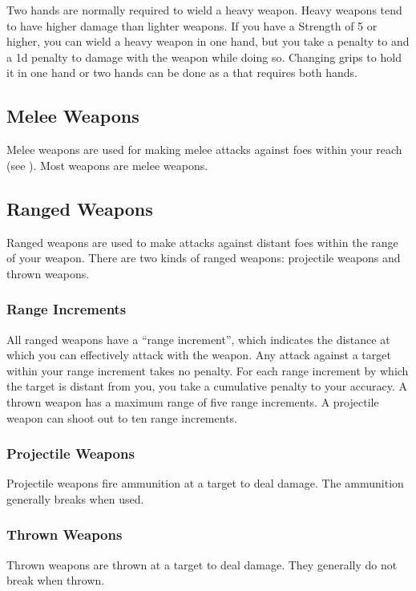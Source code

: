          Two hands are normally required to wield a heavy weapon.
        Heavy weapons tend to have higher damage than lighter weapons.
        If you have a Strength of 5 or higher, you can wield a heavy weapon in one hand, but you take a  penalty to  and a \minus1d penalty to damage with the weapon while doing so.
        Changing grips to hold it in one hand or two hands can be done as a  that requires both hands.


    \subsection{Melee Weapons}
        Melee weapons are used for making melee attacks against foes within your reach (see ). Most weapons are melee weapons.

    \subsection{Ranged Weapons}
        Ranged weapons are used to make attacks against distant foes within the range of your weapon. There are two kinds of ranged weapons: projectile weapons and thrown weapons.

        \subsubsection{Range Increments}\label{Range Increment} All ranged weapons have a ``range increment'', which indicates the distance at which you can effectively attack with the weapon. Any attack against a target within your range increment takes no penalty. For each range increment by which the target is distant from you, you take a cumulative  penalty to your accuracy. A thrown weapon has a maximum range of five range increments. A projectile weapon can shoot out to ten range increments.

        \subsubsection{Projectile Weapons} Projectile weapons fire ammunition at a target to deal damage. The ammunition generally breaks when used.

        \subsubsection{Thrown Weapons}\label{Thrown Weapons} Thrown weapons are thrown at a target to deal damage. They generally do not break when thrown.

